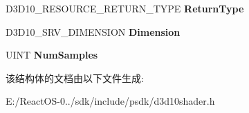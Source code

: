 \begin{DoxyCompactItemize}
D3\+D10\+\_\+\+R\+E\+S\+O\+U\+R\+C\+E\+\_\+\+R\+E\+T\+U\+R\+N\+\_\+\+T\+Y\+PE {\bfseries Return\+Type}
\item 
\mbox{\label{struct___d3_d10___s_h_a_d_e_r___i_n_p_u_t___b_i_n_d___d_e_s_c_a010ed62dbdf48c4baab0d0b1fb357674}} 
D3\+D10\+\_\+\+S\+R\+V\+\_\+\+D\+I\+M\+E\+N\+S\+I\+ON {\bfseries Dimension}
\item 
\mbox{\label{struct___d3_d10___s_h_a_d_e_r___i_n_p_u_t___b_i_n_d___d_e_s_c_a80a5331cccc1a0cc91e5d368b500959f}} 
U\+I\+NT {\bfseries Num\+Samples}
\end{DoxyCompactItemize}


该结构体的文档由以下文件生成\+:\begin{DoxyCompactItemize}
\item 
E\+:/\+React\+O\+S-\/0../sdk/include/psdk/d3d10shader.\+h\end{DoxyCompactItemize}
